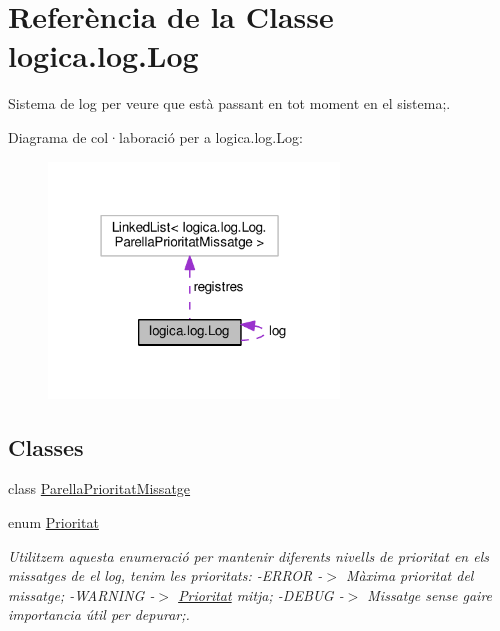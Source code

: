\hypertarget{classlogica_1_1log_1_1_log}{\section{Referència de la Classe logica.\+log.\+Log}
\label{classlogica_1_1log_1_1_log}
}


Sistema de log per veure que està passant en tot moment en el sistema;.  




Diagrama de col·laboració per a logica.\+log.\+Log\+:
\nopagebreak
\begin{figure}[H]
\begin{center}
\leavevmode
\includegraphics[width=219pt]{classlogica_1_1log_1_1_log__coll__graph}
\end{center}
\end{figure}
\subsection*{Classes}
\begin{DoxyCompactItemize}
\item 
class \hyperlink{classlogica_1_1log_1_1_log_1_1_parella_prioritat_missatge}{Parella\+Prioritat\+Missatge}
\item 
enum \hyperlink{enumlogica_1_1log_1_1_log_1_1_prioritat}{Prioritat}
\begin{DoxyCompactList}\small\item\em Utilitzem aquesta enumeració per mantenir diferents nivells de prioritat en els missatges de el log, tenim les prioritats\+: -\/\+E\+R\+R\+O\+R -\/$>$ Màxima prioritat del missatge; -\/\+W\+A\+R\+N\+I\+N\+G -\/$>$ \hyperlink{enumlogica_1_1log_1_1_log_1_1_prioritat}{Prioritat} mitja; -\/\+D\+E\+B\+U\+G -\/$>$ Missatge sense gaire importancia útil per depurar;. \end{DoxyCompactList}\end{DoxyCompactItemize}
